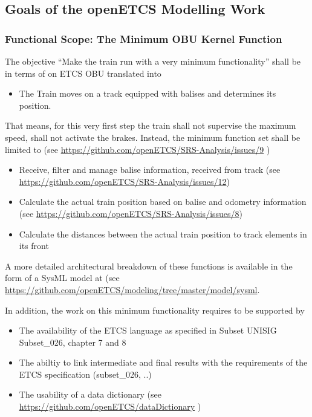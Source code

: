 \subsection{Goals of the openETCS Modelling Work}


\subsubsection{Functional Scope: The Minimum OBU Kernel Function}
\label{sec:FunctionalScopeTheMinimumOBUKernelFunction}

The objective “Make the train run with a very minimum functionality” shall be in terms of on ETCS OBU translated into 
\begin{itemize}
	\item The Train moves on a track equipped with balises and determines its position.
\end{itemize}

That means, for this very first step the train shall not supervise the maximum speed, shall not activate the brakes. Instead, the minimum function set shall be limited to (see \url{https://github.com/openETCS/SRS-Analysis/issues/9} ) 
\begin{itemize}
	\item Receive, filter and manage balise information, received from track (see \url{https://github.com/openETCS/SRS-Analysis/issues/12})
	\item Calculate the actual train position based on balise and odometry information (see \url{https://github.com/openETCS/SRS-Analysis/issues/8})
	\item Calculate the distances between the actual train position to track elements in its front
\end{itemize}

A more detailed architectural breakdown of these functions is available in the form of a SysML model at (see \url{https://github.com/openETCS/modeling/tree/master/model/sysml}. 

In addition, the work on this minimum functionality requires to be supported by
\begin{itemize}
	\item The availability of the ETCS language as specified in Subset UNISIG Subset\_026, chapter 7 and 8
	\item The abiltiy to link intermediate and final results with the requirements of the ETCS specification (subset\_026, ..) 
	\item The usability of a data dictionary (see \url{https://github.com/openETCS/dataDictionary} )
\end{itemize}


